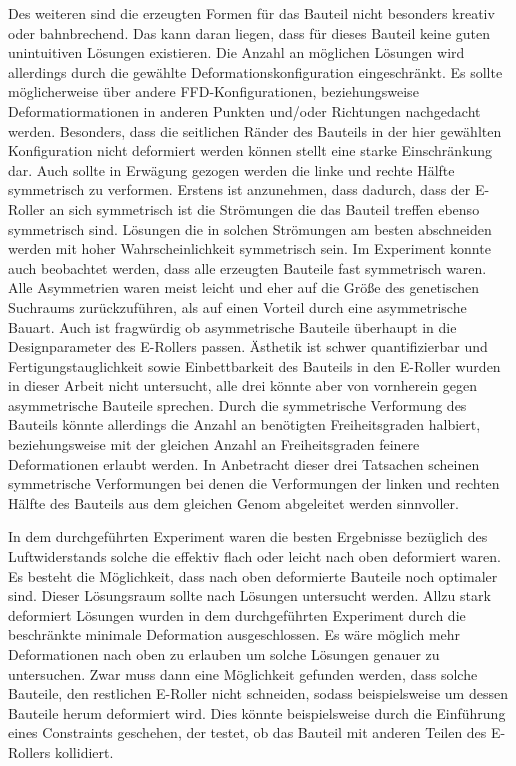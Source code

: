 Des weiteren sind die erzeugten Formen für das Bauteil nicht besonders kreativ oder bahnbrechend.
Das kann daran liegen, dass für dieses Bauteil keine guten unintuitiven Lösungen existieren.
Die Anzahl an möglichen Lösungen wird allerdings durch die gewählte Deformationskonfiguration eingeschränkt.
Es sollte möglicherweise über andere FFD-Konfigurationen, beziehungsweise Deformatiormationen in anderen Punkten und/oder Richtungen nachgedacht werden.
Besonders, dass die seitlichen Ränder des Bauteils in der hier gewählten Konfiguration nicht deformiert werden können stellt eine starke Einschränkung dar.
Auch sollte in Erwägung gezogen werden die linke und rechte Hälfte symmetrisch zu verformen.
Erstens ist anzunehmen, dass dadurch, dass der E-Roller an sich symmetrisch ist die Strömungen die das Bauteil treffen ebenso symmetrisch sind.
Lösungen die in solchen Strömungen am besten abschneiden werden mit hoher Wahrscheinlichkeit symmetrisch sein.
Im Experiment konnte auch beobachtet werden, dass alle erzeugten Bauteile fast symmetrisch waren.
Alle Asymmetrien waren meist leicht und eher auf die Größe des genetischen Suchraums zurückzuführen, als auf einen Vorteil durch eine asymmetrische Bauart.
Auch ist fragwürdig ob  asymmetrische Bauteile überhaupt in die Designparameter des E-Rollers passen.
Ästhetik ist schwer quantifizierbar und Fertigungstauglichkeit sowie Einbettbarkeit des Bauteils in den E-Roller wurden in dieser Arbeit nicht untersucht, alle drei könnte aber von vornherein gegen asymmetrische Bauteile sprechen.
Durch die symmetrische Verformung des Bauteils könnte allerdings die Anzahl an benötigten Freiheitsgraden halbiert, beziehungsweise mit der gleichen Anzahl an Freiheitsgraden feinere Deformationen erlaubt werden.
In Anbetracht dieser drei Tatsachen scheinen symmetrische Verformungen bei denen die Verformungen der linken und rechten Hälfte des Bauteils aus dem gleichen Genom abgeleitet werden sinnvoller.

In dem durchgeführten Experiment waren die besten Ergebnisse bezüglich des Luftwiderstands solche die effektiv flach oder leicht nach oben deformiert waren.
Es besteht die Möglichkeit, dass nach oben deformierte Bauteile noch optimaler sind.
Dieser Lösungsraum sollte nach Lösungen untersucht werden.
Allzu stark deformiert Lösungen wurden in  dem durchgeführten Experiment durch die beschränkte minimale Deformation ausgeschlossen.
Es wäre möglich mehr Deformationen nach oben zu erlauben um solche Lösungen genauer zu untersuchen.
Zwar muss dann eine Möglichkeit gefunden werden, dass solche Bauteile, den restlichen E-Roller nicht schneiden, sodass beispielsweise um dessen Bauteile herum deformiert wird.
Dies könnte beispielsweise durch die Einführung eines Constraints geschehen, der testet, ob das Bauteil mit anderen Teilen des E-Rollers kollidiert.

